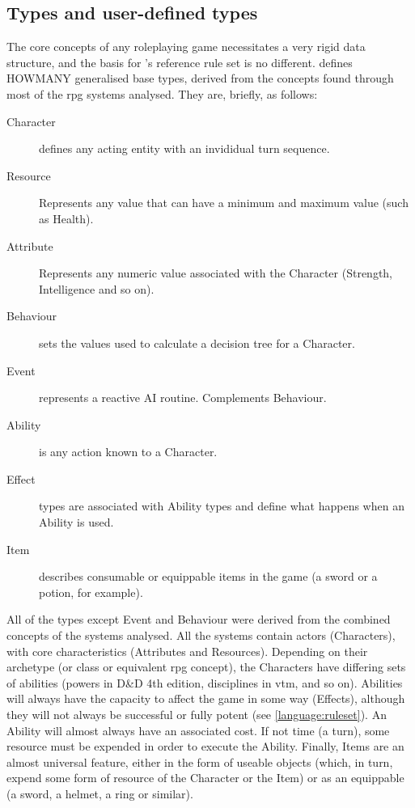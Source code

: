 \subsection{Types and user-defined types}
\label{language:types}
The core concepts of any roleplaying game necessitates a very rigid data structure, and the basis for \langname{}'s reference rule set is no different.
\langname{} defines HOWMANY generalised base types, derived from the concepts found through most of the \ac{rpg} systems analysed. They are, briefly, as follows:
\begin{description}
	\item[Character] defines any acting entity with an invididual turn sequence.
	\item[Resource] Represents any value that can have a minimum and maximum value (such as Health).
	\item[Attribute] Represents any numeric value associated with the Character (Strength, Intelligence and so on).
	\item[Behaviour] sets the values used to calculate a decision tree for a Character.
	\item[Event] represents a reactive AI routine. Complements Behaviour.
	\item[Ability] is any action known to a Character.
	\item[Effect] types are associated with Ability types and define what happens when an Ability is used.
	\item[Item] describes consumable or equippable items in the game (a sword or a potion, for example).
\end{description} 

All of the types except Event and Behaviour were derived from the combined concepts of the systems analysed. All the systems contain actors (Characters), with core characteristics (Attributes and Resources). Depending on their archetype (or class or equivalent \ac{rpg} concept), the Characters have differing sets of abilities (powers in D\&{}D 4th edition, disciplines in \ac{vtm}, and so on). Abilities will always have the capacity to affect the game in some way (Effects), although they will not always be successful or fully potent (see \vref{language:ruleset}). An Ability will almost always have an associated cost. If not time (a turn), some resource must be expended in order to execute the Ability. Finally, Items are an almost universal feature, either in the form of useable objects (which, in turn, expend some form of resource of the Character or the Item) or as an equippable (a sword, a helmet, a ring or similar).

